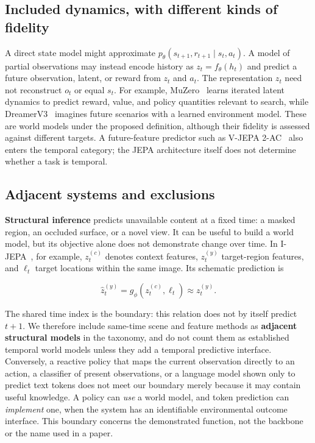 \IfFileExists{IEEEtran.cls}{\documentclass[journal]{IEEEtran}}{\documentclass[twocolumn]{article}}
\begin{document}
\subsection{Included dynamics, with different kinds of fidelity}\label{included-dynamics-with-different-kinds-of-fidelity}

A direct state model might approximate \(p_\theta(s_{t+1},r_{t+1}\mid s_t,a_t)\). A model of partial observations may instead encode history as \(z_t=f_\theta(h_t)\) and predict a future observation, latent, or reward from \(z_t\) and \(a_t\). The representation \(z_t\) need not reconstruct \(o_t\) or equal \(s_t\). For example, MuZero~\cite{ref2} learns iterated latent dynamics to predict reward, value, and policy quantities relevant to search, while DreamerV3~\cite{ref3} imagines future scenarios with a learned environment model. These are world models under the proposed definition, although their fidelity is assessed against different targets. A future-feature predictor such as V-JEPA 2-AC~\cite{ref4} also enters the temporal category; the JEPA architecture itself does not determine whether a task is temporal.

\subsection{Adjacent systems and exclusions}\label{adjacent-systems-and-exclusions}

\textbf{Structural inference} predicts unavailable content at a fixed time: a masked region, an occluded surface, or a novel view. It can be useful to build a world model, but its objective alone does not demonstrate change over time. In I-JEPA~\cite{ref5}, for example, \(z_t^{(c)}\) denotes context features, \(z_t^{(y)}\) target-region features, and \(\ell_t\) target locations within the same image. Its schematic prediction is

\[
\hat z_t^{(y)}=g_\phi(z_t^{(c)},\ell_t)\approx z_t^{(y)}.
\]

The shared time index is the boundary: this relation does not by itself predict \(t+1\). We therefore include same-time scene and feature methods as \textbf{adjacent structural models} in the taxonomy, and do not count them as established temporal world models unless they add a temporal predictive interface. Conversely, a reactive policy that maps the current observation directly to an action, a classifier of present observations, or a language model shown only to predict text tokens does not meet our boundary merely because it may contain useful knowledge. A policy can \emph{use} a world model, and token prediction can \emph{implement} one, when the system has an identifiable environmental outcome interface. This boundary concerns the demonstrated function, not the backbone or the name used in a paper.
\end{document}
